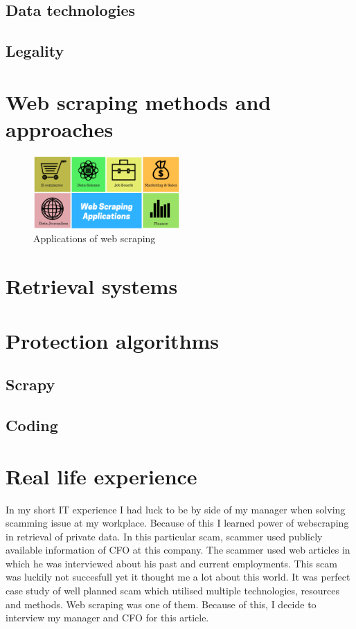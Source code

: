 \documentclass[10pt,twoside]{article}
\begin{document}
\subsection{Data technologies}

\subsection{Legality}

\section{Web scraping methods and approaches}\label{methods-approaches}

\begin{figure}[htp]
  \centering
  \includegraphics[width=0.5\textwidth]{photo1}
  \caption{Applications of web scraping\cite{towardsdatascience-web-scraping}}
  
\end{figure}

\section{Retrieval systems}\label{even-more-important-section}

\section{Protection algorithms}\label{protection-algorithms}
\subsection{Scrapy}
\subsection{Coding}

\section{Real life experience}\label{real-life-experience}
In my short IT experience I had luck to be by side of my manager when solving scamming issue at my workplace. Because of this I learned power of webscraping in retrieval of private data. In this particular scam, scammer used publicly available information of CFO at this company. The scammer used web articles in which he was interviewed about his past and current employments. This scam was luckily not succesfull yet it thought me a lot about this world. It was perfect case study of well planned scam which utilised multiple technologies, resources and methods. Web scraping was one of them. Because of this, I decide to interview my manager and CFO for this article.
\end{document}
